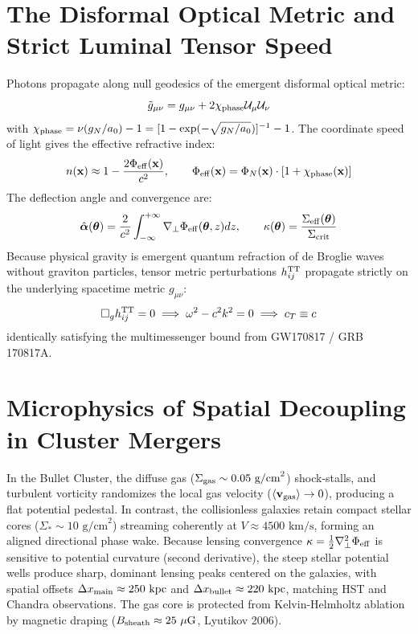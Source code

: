 \documentclass[11pt,a4paper]{article}
\begin{document}
\section{The Disformal Optical Metric and Strict Luminal Tensor Speed}
Photons propagate along null geodesics of the emergent disformal optical metric:
\begin{equation}
\tilde{g}_{\mu\nu} = g_{\mu\nu} + 2 \chi_{\rm phase} \mathcal{U}_\mu \mathcal{U}_\nu
\end{equation}
with $\chi_{\rm phase} = \nu(g_N/a_0) - 1 = [1 - \exp(-\sqrt{g_N/a_0})]^{-1} - 1$.
The coordinate speed of light gives the effective refractive index:
\begin{equation}
n(\mathbf{x}) \approx 1 - \frac{2\Phi_{\rm eff}(\mathbf{x})}{c^2}, \qquad \Phi_{\rm eff}(\mathbf{x}) = \Phi_N(\mathbf{x}) \cdot [1 + \chi_{\rm phase}(\mathbf{x})]
\end{equation}
The deflection angle and convergence are:
\begin{equation}
\hat{\boldsymbol{\alpha}}(\boldsymbol{\theta}) = \frac{2}{c^2} \int_{-\infty}^{+\infty} \nabla_\perp \Phi_{\rm eff}(\boldsymbol{\theta}, z) dz, \qquad \kappa(\boldsymbol{\theta}) = \frac{\Sigma_{\rm eff}(\boldsymbol{\theta})}{\Sigma_{\rm crit}}
\end{equation}
Because physical gravity is emergent quantum refraction of de Broglie waves without graviton particles, tensor metric perturbations $h_{ij}^{\rm TT}$ propagate strictly on the underlying spacetime metric $g_{\mu\nu}$:
\begin{equation}
\Box_g h_{ij}^{\rm TT} = 0 \implies \omega^2 - c^2 k^2 = 0 \implies c_T \equiv c
\end{equation}
identically satisfying the multimessenger bound from GW170817 / GRB 170817A.

\section{Microphysics of Spatial Decoupling in Cluster Mergers}
In the Bullet Cluster, the diffuse gas ($\Sigma_{\rm gas} \sim 0.05\text{ g/cm}^2$) shock-stalls, and turbulent vorticity randomizes the local gas velocity ($\langle \mathbf{v}_{\rm gas} \rangle \to 0$), producing a flat potential pedestal. In contrast, the collisionless galaxies retain compact stellar cores ($\Sigma_* \sim 10\text{ g/cm}^2$) streaming coherently at $V \approx 4500\text{ km/s}$, forming an aligned directional phase wake.
Because lensing convergence $\kappa = \frac{1}{2}\nabla_\perp^2 \Phi_{\rm eff}$ is sensitive to potential curvature (second derivative), the steep stellar potential wells produce sharp, dominant lensing peaks centered on the galaxies, with spatial offsets $\Delta x_{\rm main} \approx 250\text{ kpc}$ and $\Delta x_{\rm bullet} \approx 220\text{ kpc}$, matching HST and Chandra observations. The gas core is protected from Kelvin-Helmholtz ablation by magnetic draping ($B_{\rm sheath} \approx 25\ \mu\text{G}$, Lyutikov 2006).
\end{document}
